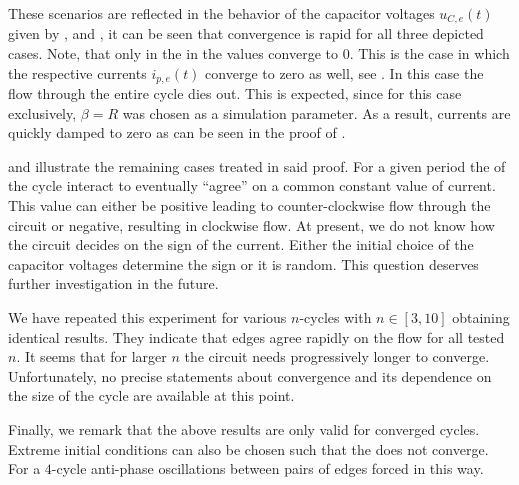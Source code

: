 		These scenarios are reflected in the behavior of the capacitor voltages $u_{C,e}(t)$ given by ,  and , it can be seen that convergence is rapid for all three depicted cases. Note, that only in the in  the values converge to $0$. This is the case in which the respective currents $i_{p,e}(t)$ converge to zero{} as well, see . In this case the flow through the entire cycle dies out. This is expected, since for this case exclusively, $\beta = R$ was chosen as a simulation parameter. As a result, currents are quickly damped to zero as can be seen in the proof of .

		 and  illustrate the remaining cases treated in said proof. For a given period the \Pes of the cycle interact to eventually ``agree'' on a common constant value of current. This value can either be positive leading to counter-clockwise flow through the circuit or negative, resulting in clockwise flow. At present, we do not know how the circuit decides on the sign of the current. Either the initial choice of the capacitor voltages determine the sign or it is random. This question deserves further investigation in the future.

		We have repeated this experiment for various $n$-cycles with $n \in [3,10]$ obtaining identical results. They indicate that edges agree rapidly on the flow for all tested $n$. It seems that for larger $n$ the circuit needs progressively longer to converge. Unfortunately, no precise statements about convergence and its dependence on the size of the cycle are available at this point.

		Finally, we remark that the above results are only valid for converged cycles. Extreme initial conditions can also be chosen such that the \Pn does not converge. For a $4$-cycle anti-phase oscillations between pairs of edges forced in this way.  

